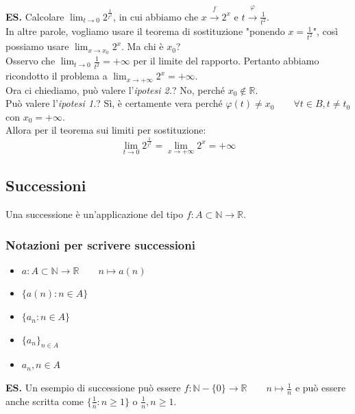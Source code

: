 \documentclass{article}
\begin{document}
\noindent\textbf{ES.} Calcolare $\lim_{t \to 0} 2^\frac{1}{t^2}$, in cui abbiamo che $x \overset{f}{\xrightarrow{}} 2^x$ e $t \overset{\varphi}{\xrightarrow{}} \frac{1}{t^2}$.\\
In altre parole, vogliamo usare il teorema di sostituzione "ponendo $x = \frac{1}{t^2}$", così possiamo usare $\lim_{x \to x_0} 2^x$. Ma chi è $x_0$?\\
Osservo che $\lim_{t \to 0} \frac{1}{t^2} = +\infty$ per il limite del rapporto. Pertanto abbiamo ricondotto il problema a $\lim_{x \to +\infty} 2^x = +\infty$. \\
Ora ci chiediamo, può valere l'\textit{ipotesi 2.}? No, perché $x_0 \notin \mathbb{R}$.\\
Può valere l'\textit{ipotesi 1.}? Sì, è certamente vera perché $\varphi(t) \neq x_0 \qquad \forall t \in B, t \neq t_0$ con $x_0 = +\infty$.\\
Allora per il teorema sui limiti per sostituzione:
\begin{equation*}
    \lim_{t \to 0} 2^\frac{1}{t^2} = \lim_{x \to +\infty} 2^x = +\infty
\end{equation*}

\subsection{Successioni}
Una successione è un'applicazione del tipo $f: A \subset \mathbb{N} \xrightarrow{} \mathbb{R}$. 

\subsubsection{Notazioni per scrivere successioni}
\begin{itemize}
    \item $a: A \subset \mathbb{N} \xrightarrow{} \mathbb{R} \qquad n \longmapsto a(n)$
    \item $\{a(n) : n \in A\}$
    \item $\{a_n : n \in A\}$
    \item $\{a_n\}_{n \in A}$
    \item $a_n, n \in A$
\end{itemize}

\noindent\textbf{ES.} Un esempio di successione può essere $f: \mathbb{N} - \{0\} \xrightarrow{} \mathbb{R} \qquad n \longmapsto \frac{1}{n}$ e può essere anche scritta come $\{\frac{1}{n} : n \geq 1\}$ o $\frac{1}{n}, n \geq 1$.
\end{document}
